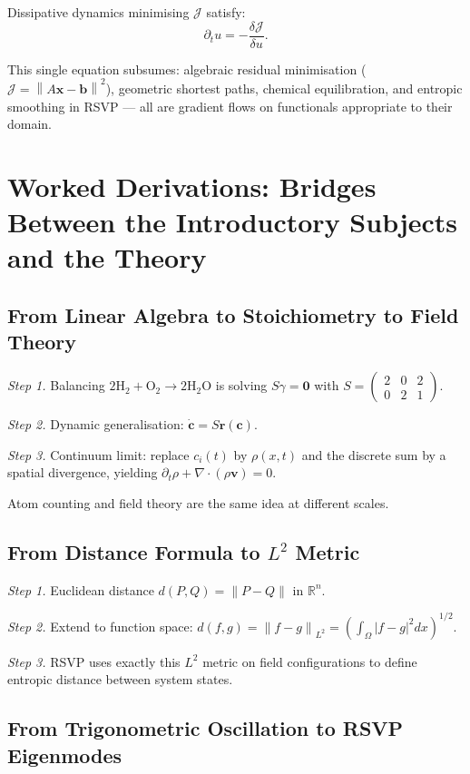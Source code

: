 \documentclass[11pt, openany]{book}
\theoremstyle{plain}
\theoremstyle{definition}
\theoremstyle{remark}
\newcommand{\R}{\mathbb{R}}
\newcommand{\norm}[1]{\left\lVert#1\right\rVert}
\begin{document}
Dissipative dynamics minimising $\mathcal{J}$ satisfy:
\[
  \partial_t u = -\frac{\delta\mathcal{J}}{\delta u}.
\]

This single equation subsumes: algebraic residual minimisation
($\mathcal{J}=\norm{A\mathbf{x}-\mathbf{b}}^2$), geometric shortest paths,
chemical equilibration, and entropic smoothing in RSVP --- all are gradient
flows on functionals appropriate to their domain.

\chapter{Worked Derivations: Bridges Between the Introductory Subjects and the Theory}

\section{From Linear Algebra to Stoichiometry to Field Theory}

\textit{Step 1.} Balancing $2\mathrm{H_2+O_2\to2H_2O}$ is solving
$S\gamma=\mathbf{0}$ with
$S=\begin{pmatrix}2&0&2\\0&2&1\end{pmatrix}$.

\textit{Step 2.} Dynamic generalisation: $\dot{\mathbf{c}}=S\mathbf{r}(\mathbf{c})$.

\textit{Step 3.} Continuum limit: replace $c_i(t)$ by $\rho(x,t)$ and
the discrete sum by a spatial divergence, yielding
$\partial_t\rho+\nabla\cdot(\rho\mathbf{v})=0$.

Atom counting and field theory are the same idea at different scales.

\section{From Distance Formula to $L^2$ Metric}

\textit{Step 1.} Euclidean distance $d(P,Q)=\norm{P-Q}$ in $\R^n$.

\textit{Step 2.} Extend to function space:
$d(f,g)=\norm{f-g}_{L^2}=\left(\int_\Omega|f-g|^2dx\right)^{1/2}$.

\textit{Step 3.} RSVP uses exactly this $L^2$ metric on field configurations
to define entropic distance between system states.

\section{From Trigonometric Oscillation to RSVP Eigenmodes}
\end{document}
